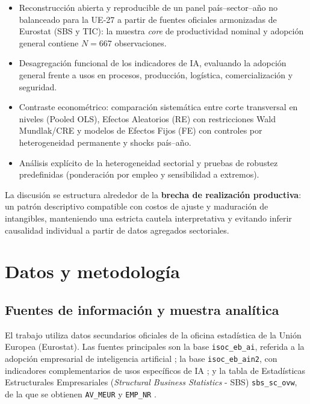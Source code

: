 \documentclass[12pt,a4paper]{article}
\begin{document}
\begin{itemize}

    \item Reconstrucción abierta y reproducible de un panel país--sector--año no balanceado para la UE-27 a partir de fuentes oficiales armonizadas de Eurostat (SBS y TIC): la muestra \textit{core} de productividad nominal y adopción general contiene $N=667$ observaciones.

    \item Desagregación funcional de los indicadores de IA, evaluando la adopción general frente a usos en procesos, producción, logística, comercialización y seguridad.

    \item Contraste econométrico: comparación sistemática entre corte transversal en niveles (Pooled OLS), Efectos Aleatorios (RE) con restricciones Wald Mundlak/CRE y modelos de Efectos Fijos (FE) con controles por heterogeneidad permanente y shocks país--año.

    \item Análisis explícito de la heterogeneidad sectorial y pruebas de robustez predefinidas (ponderación por empleo y sensibilidad a extremos).

\end{itemize}

La discusión se estructura alrededor de la \textbf{brecha de realización productiva}: un patrón descriptivo compatible con costos de ajuste y maduración de intangibles, manteniendo una estricta cautela interpretativa y evitando inferir causalidad individual a partir de datos agregados sectoriales.

\section{Datos y metodología}

\subsection{Fuentes de información y muestra analítica}

El trabajo utiliza datos secundarios oficiales de la oficina estadística de la Unión Europea (Eurostat). Las fuentes principales son la base \texttt{isoc\_eb\_ai}, referida a la adopción empresarial de inteligencia artificial \citep{eurostat_ai}; la base \texttt{isoc\_eb\_ain2}, con indicadores complementarios de usos específicos de IA \citep{eurostat_ain2}; y la tabla de Estadísticas Estructurales Empresariales (\textit{Structural Business Statistics} - SBS) \texttt{sbs\_sc\_ovw}, de la que se obtienen \texttt{AV\_MEUR} y \texttt{EMP\_NR} \citep{eurostat_sbs}.
\end{document}
